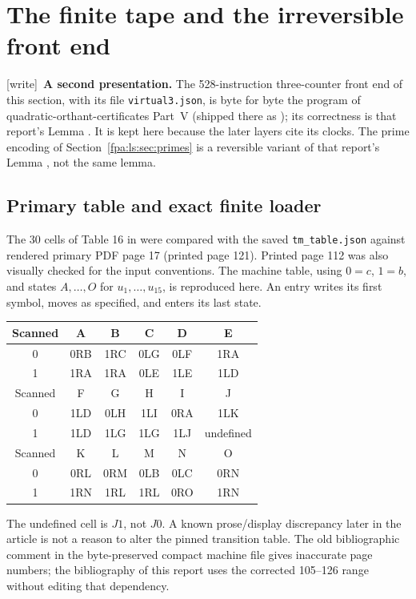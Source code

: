 \documentclass[11pt,a4paper]{article}
\numberwithin{equation}{section}
\newcommand{\code}[1]{\texttt{\small #1}}
\newcommand{\wtag}{\textup{[write]}}
\begin{document}
\section{The finite tape and the irreversible front end}\label{fpa:ls:sec:frontend}
\wtag\ \textbf{A second presentation.} The 528-instruction three-counter front end of this section, with its file \code{virtual3.json}, is byte for byte the program of quadratic-orthant-certificates Part~V (shipped there as ); its correctness is that report's Lemma . It is kept here because the later layers cite its clocks. The prime encoding of Section~\ref{fpa:ls:sec:primes} is a reversible variant of that report's Lemma , not the same lemma.

\subsection{Primary table and exact finite loader}
The 30 cells of Table 16 in \cite{fpa:nw} were compared with the saved
\code{tm\_table.json} against rendered primary PDF page 17 (printed page 121).
Printed page 112 was also visually checked for the input conventions. The
machine table, using $0=c$, $1=b$, and states $A,\ldots,O$ for
$u_1,\ldots,u_{15}$, is reproduced here. An entry writes its first symbol,
moves as specified, and enters its last state.
\begin{center}
\begin{tabular}{c*{5}{c}}\toprule
Scanned & A & B & C & D & E\\\midrule
0 & 0RB & 1RC & 0LG & 0LF & 1RA\\
1 & 1RA & 1RA & 0LE & 1LE & 1LD\\\midrule
Scanned & F & G & H & I & J\\\midrule
0 & 1LD & 0LH & 1LI & 0RA & 1LK\\
1 & 1LD & 1LG & 1LG & 1LJ & undefined\\\midrule
Scanned & K & L & M & N & O\\\midrule
0 & 0RL & 0RM & 0LB & 0LC & 0RN\\
1 & 1RN & 1RL & 1RL & 0RO & 1RN\\\bottomrule
\end{tabular}
\end{center}
The undefined cell is $J1$, not $J0$. A known prose/display discrepancy later
in the article is not a reason to alter the pinned transition table. The
old bibliographic comment in the byte-preserved compact machine file gives
inaccurate page numbers; the bibliography of this report uses the corrected
105--126 range without editing that dependency.
\end{document}
